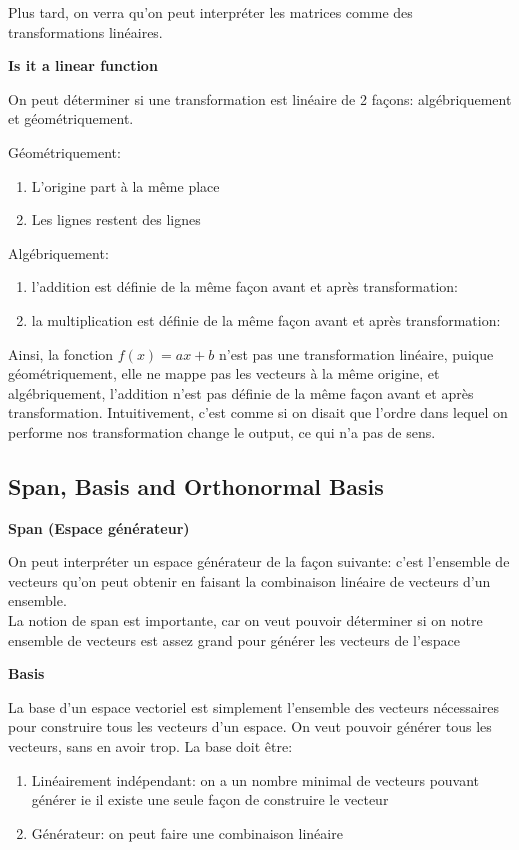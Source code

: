 \documentclass{article}
\begin{document}
Plus tard, on verra qu'on peut interpréter les matrices comme des
transformations linéaires.

\textbf{Is it a linear function}

On peut déterminer si une transformation est linéaire de 2 façons:
algébriquement et géométriquement.

Géométriquement:
\begin{enumerate}
    \item L'origine part à la même place
    \item Les lignes restent des lignes
\end{enumerate}

Algébriquement:
\begin{enumerate}
    \item l'addition est définie de la même façon avant et après
	transformation:
    \item la multiplication est définie de la même façon avant et après
	transformation:
\end{enumerate}

Ainsi, la fonction $f(x) = ax+b$ n'est pas une transformation linéaire,
puique géométriquement, elle ne mappe pas les vecteurs à la même origine,
et algébriquement, l'addition n'est pas définie de la même façon avant
et après transformation. Intuitivement, c'est comme si on disait que
l'ordre dans lequel on performe nos transformation change le output,
ce qui n'a pas de sens.

\subsection{Span, Basis and Orthonormal Basis}

\textbf{Span (Espace générateur)}

On peut interpréter un espace générateur de la façon suivante: c'est
l'ensemble de vecteurs qu'on peut obtenir en faisant la combinaison
linéaire de vecteurs d'un ensemble.\\

La notion de span est importante, car on veut pouvoir déterminer si on
notre ensemble de vecteurs est assez grand pour générer les vecteurs
de l'espace

\textbf{Basis}

La base d'un espace vectoriel est simplement l'ensemble des vecteurs
nécessaires pour construire tous les vecteurs d'un espace. On veut
pouvoir générer tous les vecteurs, sans en avoir trop. La base doit être:
\begin{enumerate}
    \item Linéairement indépendant: on a un nombre minimal de vecteurs
	pouvant générer ie il existe une seule façon de construire
	le vecteur
    \item Générateur: on peut faire une combinaison linéaire
\end{enumerate}
\end{document}
